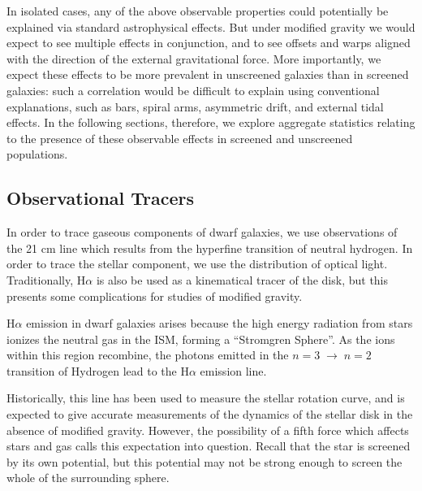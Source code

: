 \documentclass{emulateapj}
\newcommand{\ha}{H$\alpha$}
\begin{document}
In isolated cases,
any of the above observable properties could potentially be explained via
standard astrophysical effects.  But under modified gravity we would expect
to see multiple effects in conjunction, and to see offsets and warps
aligned with the direction of the external gravitational force.
More importantly, we expect these effects to be more prevalent
in unscreened galaxies than in screened galaxies: such a correlation
would be difficult to explain using conventional explanations,
such as bars, spiral arms, asymmetric drift, and external tidal effects.
In the following sections, therefore, we explore aggregate statistics
relating to the presence of these observable effects in screened and
unscreened populations. 

\subsection{Observational Tracers}
\label{sec:halpha}

In order to trace gaseous components of dwarf galaxies,
we use observations of the 21 cm line which results from the hyperfine
transition of neutral hydrogen.
In order to trace the stellar component, we use the distribution of optical
light.  Traditionally, \ha{} is also be used as a kinematical tracer
of the disk, but this presents some complications for studies of
modified gravity.

\ha{} emission in dwarf galaxies arises because
the high energy radiation from stars ionizes the neutral gas in the ISM,
forming a  ``Stromgren Sphere''.
As the ions within this region recombine,
the photons emitted in the $n=3\;\to\;n=2$ transition
of Hydrogen lead to the \ha{} emission line.

Historically, this line has been
used to measure the stellar rotation curve, and is expected to give accurate
measurements of the dynamics of the stellar disk in the absence of modified
gravity. However, the possibility of a fifth force which
affects stars and gas calls this expectation into question.
Recall that the star is screened by its own potential, but this potential
may not be strong enough to screen the whole of the surrounding sphere.
\end{document}
